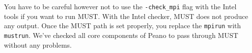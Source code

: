 \noindent
You have to be careful however not to use the \texttt{-check\_mpi} flag with the
Intel tools if you want to run MUST.
With the Intel checker, MUST does not produce any output.
Once the MUST path is set properly, you replace the \texttt{mpirun} with
\texttt{mustrun}.
We've checked all core components of Peano to pass through MUST without any
problems.


% 
% 

 
% 
% 
% 
% 
% 
% 
% 
% 
% 
% 
% 
% 
% 
